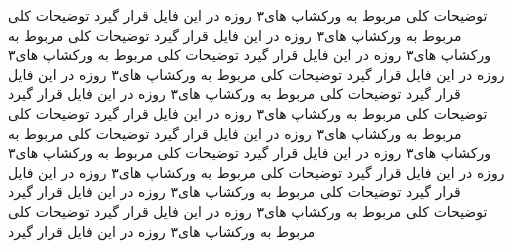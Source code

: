 توضیحات کلی مربوط به ورکشاپ های۳ روزه در این فایل قرار گیرد توضیحات کلی مربوط به ورکشاپ های۳ روزه در این فایل قرار گیرد توضیحات کلی مربوط به ورکشاپ های۳ روزه در این فایل قرار گیرد توضیحات کلی مربوط به ورکشاپ های۳ روزه در این فایل قرار گیرد توضیحات کلی مربوط به ورکشاپ های۳ روزه در این فایل قرار گیرد توضیحات کلی مربوط به ورکشاپ های۳ روزه در این فایل قرار گیرد توضیحات کلی مربوط به ورکشاپ های۳ روزه در این فایل قرار گیرد توضیحات کلی مربوط به ورکشاپ های۳ روزه در این فایل قرار گیرد توضیحات کلی مربوط به ورکشاپ های۳ روزه در این فایل قرار گیرد توضیحات کلی مربوط به ورکشاپ های۳ روزه در این فایل قرار گیرد توضیحات کلی مربوط به ورکشاپ های۳ روزه در این فایل قرار گیرد توضیحات کلی مربوط به ورکشاپ های۳ روزه در این فایل قرار گیرد توضیحات کلی مربوط به ورکشاپ های۳ روزه در این فایل قرار گیرد توضیحات کلی مربوط به ورکشاپ های۳ روزه در این فایل قرار گیرد 